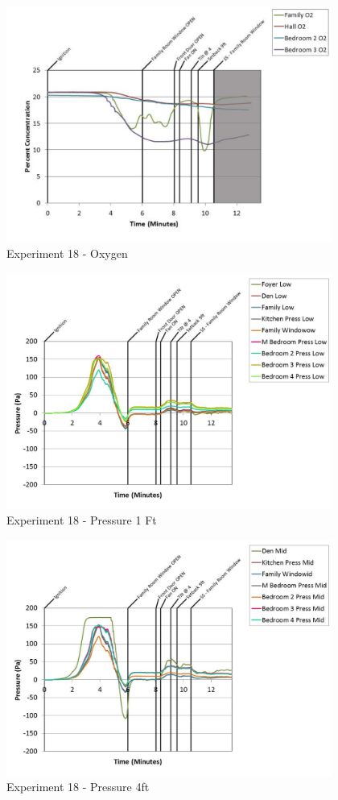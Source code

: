 \documentclass{article}
\begin{document}
\begin{appendices}
	\clearpage

	\begin{figure}[h!]
		\centering
		\includegraphics[height=3.05in]{0_Images/Results_Charts/Exp_18_Charts/Oxygen.pdf}
		\caption{Experiment 18 - Oxygen}
	\end{figure}
 

	\begin{figure}[h!]
		\centering
		\includegraphics[height=3.05in]{0_Images/Results_Charts/Exp_18_Charts/Pressure1Ft.pdf}
		\caption{Experiment 18 - Pressure 1 Ft}
	\end{figure}
 
	\clearpage

	\begin{figure}[h!]
		\centering
		\includegraphics[height=3.05in]{0_Images/Results_Charts/Exp_18_Charts/Pressure4ft.pdf}
		\caption{Experiment 18 - Pressure 4ft}
	\end{figure}
 


\end{appendices}
\end{document}
